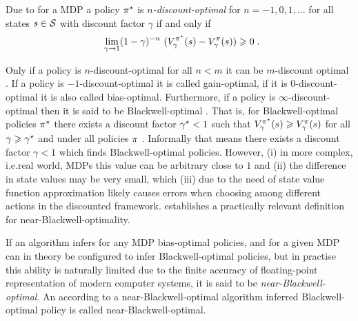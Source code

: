 \documentclass[envcountsame]{llncs}
\begin{document}

\begin{definition}
  Due to \citet{Veinott69} for a MDP a policy \(\pi^{\star}\) is \emph{\(n\)-discount-optimal} for
  \(n=-1,0,1,\ldots\) for all states \(s \in \mathcal{S}\) with discount factor
  \(\gamma\) %
  if and only if
  \begin{align*}
    \lim_{\gamma \to 1}(1-\gamma)^{-n}\ (V_{\gamma}^{\polopt}(s) - V_{\gamma}^{\pol}(s)) \geqslant 0 \tpkt
  \end{align*}
\end{definition}


Only if a policy is \(n\)-discount-optimal for all \(n < m\) it can be \(m\)-discount
optimal \citep{Puterman94,Veinott69}.
%
If a policy is \(-1\)-discount-optimal it is called gain-optimal, if it is \(0\)-discount-optimal it
is also called bias-optimal.
%
Furthermore, if a policy is \(\infty\)-discount-optimal then it is said to be Blackwell-optimal
\citep{Blackwell62}.
%
That is, for Blackwell-optimal policies \(\pi^{\star}\) there exists a discount factor \(\gamma^{\star} < 1\)
such that \(V_{\gamma}^{\pi^{\star}}(s) \geqslant V_{\gamma}^{\pi}(s)\) for all
\(\gamma \geqslant \gamma^{\star}\) and under all policies \(\pi\)
\citep{Mahadevan96_SensitiveDiscountOptimalityUnifyingDiscountedAndAverageRewardReinforcementLearning,Blackwell62}.
Informally that means there exists a discount factor \(\gamma <1\) which finds Blackwell-optimal
policies. However, (i) in more complex, i.e.\@ real world, MDPs this value can be arbitrary close to
\(1\) and (ii) the difference in state values may be very small, which (iii) due to the need of
state value function approximation likely causes errors when choosing among different actions in the
discounted framework. \citet{schneckenreither2020average} establishes a practically relevant
definition for near-Blackwell-optimality.

\begin{definition}
  If an algorithm infers for any MDP bias-optimal policies, and for a given MDP can in theory be
  configured to infer Blackwell-optimal policies, but in practise this ability is naturally limited
  due to the finite accuracy of floating-point representation of modern computer systems, it is said
  to be \emph{near-Blackwell-optimal}. An according to a near-Blackwell-optimal algorithm inferred
  Blackwell-optimal policy is called near-Blackwell-optimal.
\end{definition}
\end{document}
